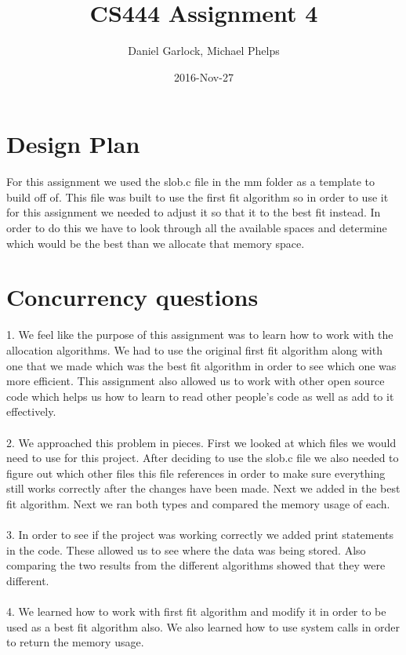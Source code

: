 \documentclass[letterpaper,10pt,titlepage,onecolumn,draftclsnofoot]{IEEETran}
\title{CS444 Assignment 4}
\author{Daniel Garlock, Michael Phelps}
\date{2016-Nov-27}
\begin{document}
\maketitle

\newpage
\tableofcontents
\newpage

\section{Design Plan}
For this assignment we used the slob.c file in the mm folder as a template to build off of. This file was built to use the first fit algorithm so in order to use it for this assignment we needed to adjust it so that it to the best fit instead. In order to do this we have to look through all the available spaces and determine which would be the best than we allocate that memory space. 

\section{Concurrency questions}
    1. We feel like the purpose of this assignment was to learn how to work with the allocation algorithms. We had to use the original first fit algorithm along with one that we made which was the best fit algorithm in order to see which one was more efficient. This assignment also allowed us to work with other open source code which helps us how to learn to read other people's code as well as add to it effectively. \\
\\
    2. We approached this problem in pieces. First we looked at which files we would need to use for this project. After deciding to use the slob.c file we also needed to figure out which other files this file references in order to make sure everything still works correctly after the changes have been made. Next we added in the best fit algorithm. Next we ran both types and compared the memory usage of each.  \\
\\
    3. In order to see if the project was working correctly we added print statements in the code. These allowed us to see where the data was being stored. Also comparing the two results from the different algorithms showed that they were different. \\
\\
    4. We learned how to work with first fit algorithm and modify it in order to be used as a best fit algorithm also. We also learned how to use system calls in order to return the memory usage. \\ 
\end{document}
